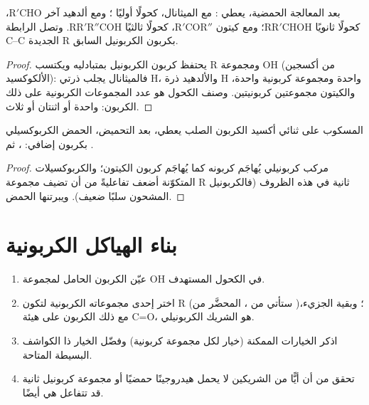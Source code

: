 \begin{proposition}\label{prop:b1:organomagnesium:carbonyl-addition}
بعد المعالجة الحمضية، يعطي  : مع الميثانال،
كحولًا أوليًا ؛ ومع ألدهيد آخر $\mathrm{R'CHO}$، كحولًا
ثانويًا $\mathrm{RR'CHOH}$؛ ومع كيتون $\mathrm{R'COR''}$، كحولًا ثالثيًا
$\mathrm{RR'R''COH}$. وتصل الرابطة C--C الجديدة R بكربون الكربونيل السابق.
\end{proposition}

\begin{proof}
يحتفظ كربون الكربونيل بمتبادليه ويكتسب R ومجموعة OH
(من أكسجين الألكوكسيد): فالميثانال يجلب ذرتي H، والألدهيد ذرة H واحدة
ومجموعة كربونية واحدة، والكيتون مجموعتين كربونيتين. وصنف الكحول هو
عدد المجموعات الكربونية على ذلك الكربون: واحدة أو اثنتان أو ثلاث.
\end{proof}

\begin{proposition}\label{prop:b1:organomagnesium:co2}
 المسكوب على ثنائي أكسيد الكربون الصلب يعطي، بعد
التحميض، الحمض الكربوكسيلي  بكربون إضافي:
، ثم .
\end{proposition}

\begin{proof}
 مركب كربونيلي يُهاجَم كربونه كما يُهاجَم كربون
الكيتون؛ والكربوكسيلات المتكوّنة أضعف تفاعليةً من أن تضيف مجموعة R ثانية
في هذه الظروف (فالكربونيل المشحون سلبًا  ضعيف). ويبرتنها الحمض.
\end{proof}

\section{بناء الهياكل الكربونية}

\begin{method}\label{met:b1:organomagnesium:plan-alcohol}
\begin{enumerate}
  \item عيّن الكربون الحامل لمجموعة OH في الكحول المستهدف.
  \item اختر إحدى مجموعاته الكربونية لتكون R (ستأتي من
        ، المحضَّر من )؛ وبقية
        الجزيء، مع ذلك الكربون على هيئة C=O، هو الشريك الكربونيلي.
  \item اذكر الخيارات الممكنة (خيار لكل مجموعة كربونية) وفضّل
        الخيار ذا الكواشف البسيطة المتاحة.
  \item تحقق من أن أيًّا من الشريكين لا يحمل هيدروجينًا حمضيًا أو مجموعة كربونيل
        ثانية قد تتفاعل هي أيضًا.
\end{enumerate}
\end{method}

